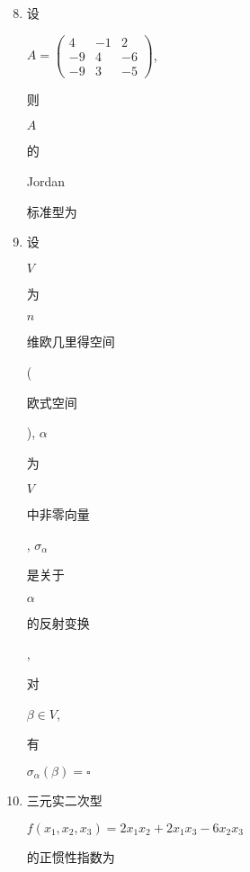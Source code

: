 \documentclass[10pt]{article}
\begin{document}
\begin{enumerate}
  \setcounter{enumi}{7}
  \item \begin{CJK}{UTF8}{mj}设\end{CJK} $A=\left(\begin{array}{ccc}4 & -1 & 2 \\ -9 & 4 & -6 \\ -9 & 3 & -5\end{array}\right)$, \begin{CJK}{UTF8}{mj}则\end{CJK} $A$ \begin{CJK}{UTF8}{mj}的\end{CJK} Jordan \begin{CJK}{UTF8}{mj}标准型为\end{CJK}

  \item \begin{CJK}{UTF8}{mj}设\end{CJK} $V$ \begin{CJK}{UTF8}{mj}为\end{CJK} $n$ \begin{CJK}{UTF8}{mj}维欧几里得空间\end{CJK}(\begin{CJK}{UTF8}{mj}欧式空间\end{CJK}), $\alpha$ \begin{CJK}{UTF8}{mj}为\end{CJK} $V$ \begin{CJK}{UTF8}{mj}中非零向量\end{CJK}, $\sigma_{\alpha}$ \begin{CJK}{UTF8}{mj}是关于\end{CJK} $\alpha$ \begin{CJK}{UTF8}{mj}的反射变换\end{CJK}, \begin{CJK}{UTF8}{mj}对\end{CJK} $\beta \in V$, \begin{CJK}{UTF8}{mj}有\end{CJK} $\sigma_{\alpha}(\beta)=\square$

  \item \begin{CJK}{UTF8}{mj}三元实二次型\end{CJK} $f\left(x_{1}, x_{2}, x_{3}\right)=2 x_{1} x_{2}+2 x_{1} x_{3}-6 x_{2} x_{3}$ \begin{CJK}{UTF8}{mj}的正惯性指数为\end{CJK}


\end{enumerate}
\end{document}
